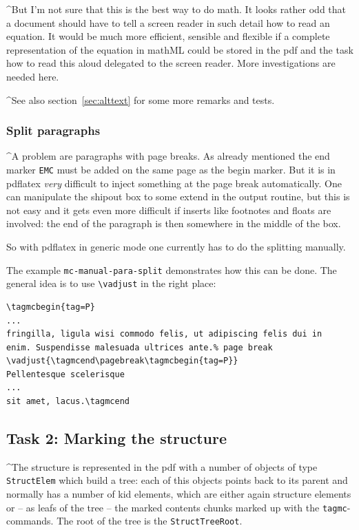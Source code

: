 \documentclass[DIV=12,parskip=half-,bibliography=totoc]{scrartcl}
\begin{document}
\TagP^But I'm not sure that this is the best way to do math. It looks rather odd that a document should have to tell a screen reader in such detail how to read an equation. It would be much more efficient, sensible and flexible if a complete representation of the equation in mathML could be stored in the pdf and the task how to read this aloud delegated to the screen reader. More investigations are needed here.\TagPend

\TagP^See also section~\ref{sec:alttext} for some more remarks and tests.\TagPend

\subsubsection{Split paragraphs}\label{sec:splitpara}

\TagP^A problem are paragraphs with page breaks.  As already mentioned the end marker \texttt{EMC} must be added on the same page as the begin marker. But it is in pdflatex \emph{very} difficult to inject something at the page break automatically. One can manipulate the shipout box to some extend in the output routine, but this is not easy and it gets even more difficult if inserts like footnotes and floats are involved: the end of the paragraph is then somewhere in the middle of the box.

\TagP So with pdflatex in generic mode one currently has to do the splitting manually.

\TagP The example \texttt{mc-manual-para-split} demonstrates how this can be done. The general idea is to use \verb+\vadjust+ in the right place:\TagPend

\begin{lstlisting}
\tagmcbegin{tag=P}
...
fringilla, ligula wisi commodo felis, ut adipiscing felis dui in
enim. Suspendisse malesuada ultrices ante.% page break
\vadjust{\tagmcend\pagebreak\tagmcbegin{tag=P}}
Pellentesque scelerisque
...
sit amet, lacus.\tagmcend
\end{lstlisting}
\tagmcend\tagstructend



\subsection{Task 2: Marking the structure}
\TagP^The structure is represented in the pdf with a number of objects of type \texttt{StructElem} which build a tree: each of this objects points back to its parent and normally has a number of kid elements, which are either again structure elements or -- as leafs of the tree -- the marked contents chunks marked up with the \verb+tagmc+-commands. The root of the tree is the \texttt{StructTreeRoot}.\TagPend
\end{document}
